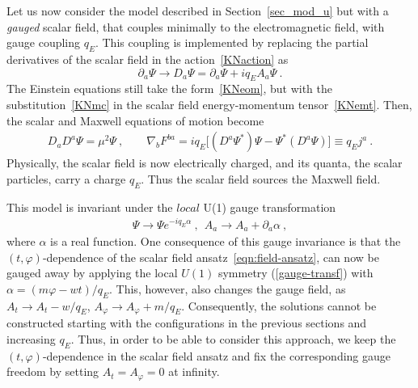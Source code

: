 Let us now consider the model described in Section~\ref{sec_mod_u} but with a \textit{gauged} scalar field, 
that couples minimally to the electromagnetic field, with gauge coupling $q_E$. 
This coupling is implemented by replacing the partial derivatives of the scalar field in the action~\eqref{KNaction} as
\begin{equation}
\partial_a \Psi \longrightarrow D_a\Psi=\partial_a \Psi + iq_E A_a \Psi \ .
\label{KNmc}
\end{equation}
The Einstein equations still take the form~\eqref{KNeom}, but with the substitution~\eqref{KNmc} 
in the scalar field energy-momentum tensor~\eqref{KNemt}. Then, the scalar and Maxwell equations of motion become
\begin{eqnarray}
\label{field-eqs}
D_{a}D^{a}\Psi=\mu^2 \Psi\ , \qquad 
\nabla_{b}F^{ba}=
iq_E \big [ (D^{a}\Psi^*) \Psi-\Psi^*(D^a \Psi) \big ] 
\equiv q_E j^a  \ .
\end{eqnarray}  
Physically, the scalar field is now electrically charged, 
and its quanta, the scalar particles, carry a charge $q_E$.
Thus the scalar field sources the Maxwell field.

This model is invariant under the $local$ U(1) gauge transformation 
\begin{eqnarray}
\label{gauge-transf}
\Psi \to \Psi e^{-i q_E \alpha}\ ,~~A_a\to A_a+\partial_a \alpha \ ,
\end{eqnarray}
where $\alpha$ is a real function. One consequence of this gauge invariance is that the $(t, \varphi)$-dependence of the scalar field ansatz~\eqref{eqn:field-ansatz}, 
can now be gauged away by applying the local $U(1)$ symmetry
(\ref{gauge-transf})
with $\alpha =  (m\varphi -w t)/q_E$.  This, however, also changes the gauge field, as $A_t\to A_t-w/q_E$,
$A_\varphi \to A_\varphi+m/q_E$. 
%
Consequently, the solutions cannot be constructed starting with the configurations in the
previous sections and increasing $q_E$.
%
Thus, in order
to be able to consider this approach, we  keep the $(t,\varphi)$-dependence in 
the scalar field ansatz and fix the corresponding gauge freedom by setting $A_t = A_\varphi = 0$ at infinity.

